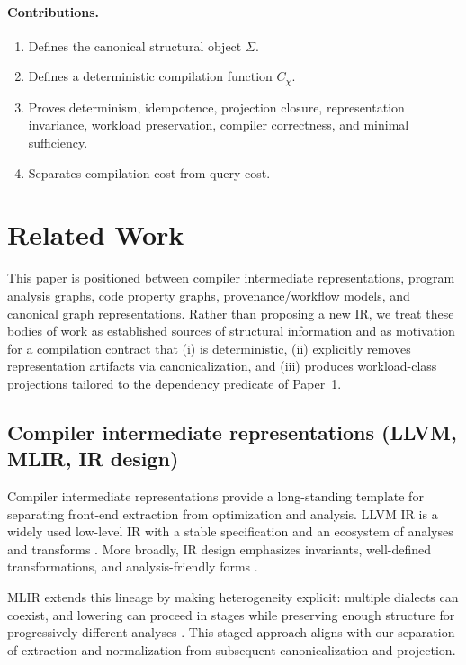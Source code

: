\documentclass[11pt]{article}
\begin{document}
\paragraph{Contributions.}
\begin{enumerate}[label=(\arabic*),leftmargin=*]
  \item Defines the canonical structural object $\Sigma$.
  \item Defines a deterministic compilation function $C_\chi$.
  \item Proves determinism, idempotence, projection closure, representation invariance, workload preservation, compiler correctness, and minimal sufficiency.
  \item Separates compilation cost from query cost.
\end{enumerate}

\section{Related Work}
\label{sec:related-work}
This paper is positioned between compiler intermediate representations, program analysis graphs, code property graphs, provenance/workflow models, and canonical graph representations. Rather than proposing a new IR, we treat these bodies of work as established sources of structural information and as motivation for a compilation contract that (i) is deterministic, (ii) explicitly removes representation artifacts via canonicalization, and (iii) produces workload-class projections tailored to the dependency predicate of Paper~1.

\subsection{Compiler intermediate representations (LLVM, MLIR, IR design)}
Compiler intermediate representations provide a long-standing template for separating front-end extraction from optimization and analysis. LLVM IR is a widely used low-level IR with a stable specification and an ecosystem of analyses and transforms \cite{llvmLangRef}. More broadly, IR design emphasizes invariants, well-defined transformations, and analysis-friendly forms \cite{muchnick1997}.

MLIR extends this lineage by making heterogeneity explicit: multiple dialects can coexist, and lowering can proceed in stages while preserving enough structure for progressively different analyses \cite{mlirDoc}. This staged approach aligns with our separation of extraction and normalization from subsequent canonicalization and projection.
\end{document}
